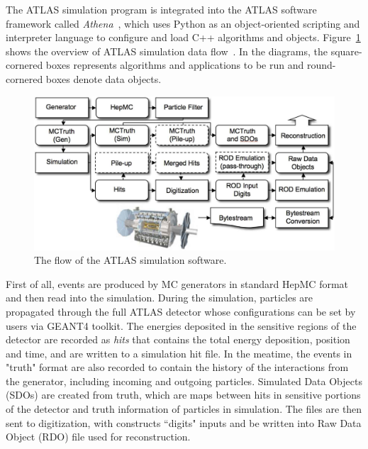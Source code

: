 
The ATLAS simulation program is integrated into the ATLAS software framework called \textit{Athena}~\cite{atlas:athena},
which uses Python as an object-oriented scripting and interpreter language to configure and load C++ algorithms and objects.
Figure~\ref{fig:frame_overview} shows the overview of ATLAS simulation data flow~\cite{Aad:2010ah}.
In the diagrams, the square-cornered boxes represents algorithms and applications to be run and round-cornered boxes denote data objects.
\begin{figure}[!htb]
  \centering
  \includegraphics[width=1.0\textwidth]{figures/Simulation/outline_atalsSimulation_v2.png}
  \caption{The flow of the ATLAS simulation software.}
  \label{fig:frame_overview}
\end{figure}

First of all, events are produced by MC generators in standard HepMC format and then read into the simulation.
During the simulation, particles are propagated through the full ATLAS detector whose configurations can be set by users via GEANT4 toolkit.
The energies deposited in the sensitive regions of the detector are recorded as \textit{hits} that contains the total energy deposition,
position and time, and are written to a simulation hit file.
In the meatime, the events in "truth" format are also recorded to contain the history of the interactions from the generator, including incoming and outgoing particles.
Simulated Data Objects (SDOs) are created from truth, which are maps between hits in sensitive portions of the detector and truth information of particles in simulation.
The files are then sent to digitization, with constructs ``digits" inputs and be written into Raw Data Object (RDO) file used for reconstruction.

